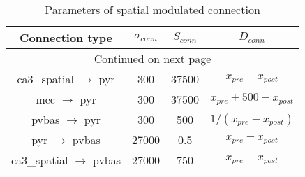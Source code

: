 \begin{longtable}{cccc}
\caption{Parameters of spatial modulated connection}
\label{spat_conn}\\
\toprule
Connection type & $\sigma_{conn}$ & $S_{conn}$ & $D_{conn}$ \\
\midrule
\endhead
\midrule
\multicolumn{4}{c}{{Continued on next page}} \\
\midrule
\endfoot

\bottomrule
\endlastfoot
ca3\_spatial $\rightarrow$  pyr  & 300 &    37500 &  $x_{pre} - x_{post}$  \\
mec $\rightarrow$  pyr  &   300 &     37500        &  $x_{pre} + 500 - x_{post}$\\
pvbas $\rightarrow$ pyr &   300 &      500       &  $1/(x_{pre} - x_{post})$\\
pyr $\rightarrow$ pvbas  &   27000   &     0.5 &  $x_{pre} - x_{post}$\\
ca3\_spatial $\rightarrow$ pvbas        &   27000  &      750 &  $x_{pre} - x_{post}$\\
\end{longtable}
